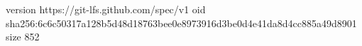 version https://git-lfs.github.com/spec/v1
oid sha256:6c6c50317a128b5d48d18763bee0e8973916d3be0d4e41da8d4cc885a49d8901
size 852

